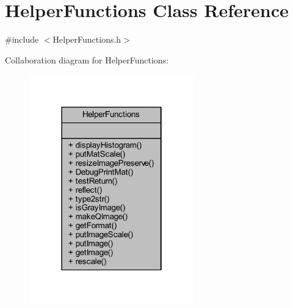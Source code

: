 \hypertarget{class_helper_functions}{}\section{Helper\+Functions Class Reference}
\label{class_helper_functions}


{\ttfamily \#include $<$Helper\+Functions.\+h$>$}



Collaboration diagram for Helper\+Functions\+:
\nopagebreak
\begin{figure}[H]
\begin{center}
\leavevmode
\includegraphics[width=202pt]{class_helper_functions__coll__graph}
\end{center}
\end{figure}
